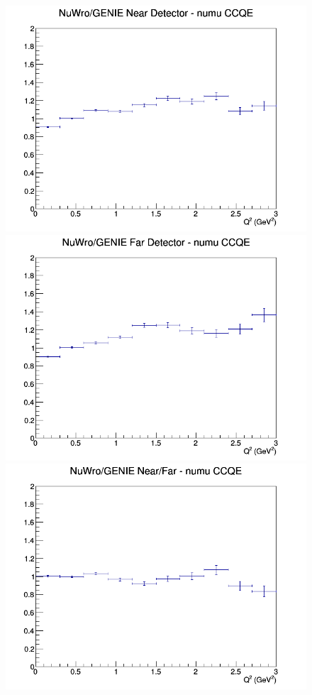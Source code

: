 \documentclass[12pt]{article}
\begin{document}
\begin{figure}[h]
\endminipage
\newline
{}
\includegraphics[width=\linewidth]{Q2/nominal/ratios/CCQE_NuWro_GENIE_numu_near_Q2.png}
\endminipage
{}
\includegraphics[width=\linewidth]{Q2/nominal/ratios/CCQE_NuWro_GENIE_numu_far_Q2.png}
\endminipage
{}
\includegraphics[width=\linewidth]{Q2/nominal/ratios/CCQE_NuWro_GENIE_numu_NF_Q2.png}

\end{figure}
\end{document}

